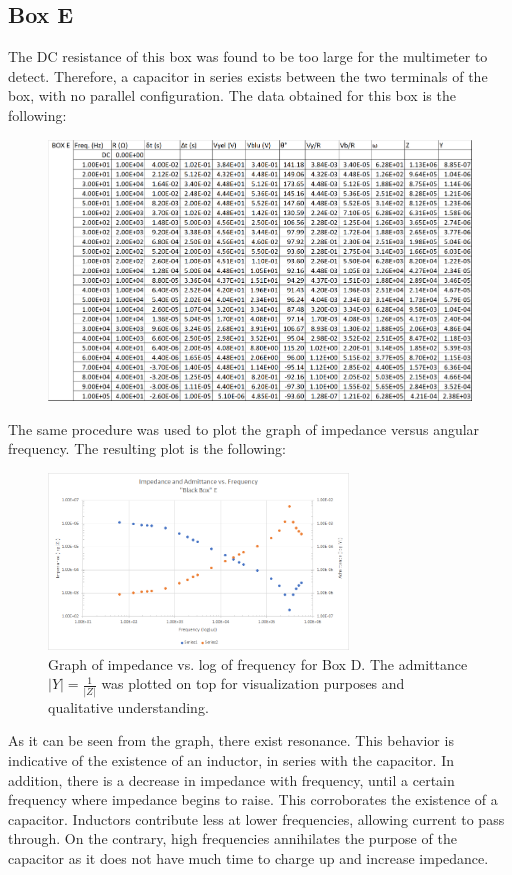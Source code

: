 \documentclass[a4paper]{article}
\begin{document}
\subsection{Box E}
The DC resistance of this box was found to be too large for the multimeter to detect. Therefore, a capacitor in series exists between the two terminals of the box, with no parallel configuration. The data obtained for this box is the following:
\begin{figure}[h]
\centering
\includegraphics[width=1.0\textwidth]{boxe}
\end{figure}

The same procedure was used to plot the graph of impedance versus angular frequency. The resulting plot is the following:
\begin{figure}[h]
\centering
\includegraphics[width=0.71\textwidth]{boxeplot}
\caption{Graph of impedance vs. log of frequency for Box D. The admittance $|Y|=\frac{1}{|Z|}$ was plotted on top for visualization purposes and qualitative understanding.}
\end{figure}

As it can be seen from the graph, there exist resonance. This behavior is indicative of the existence of an inductor, in series with the capacitor. In addition, there is a decrease in impedance with frequency, until a certain frequency where impedance begins to raise. This corroborates the existence of a capacitor. Inductors contribute less at lower frequencies, allowing current to pass through. On the contrary, high frequencies annihilates the purpose of the capacitor as it does not have much time to charge up and increase impedance. 
\end{document}
